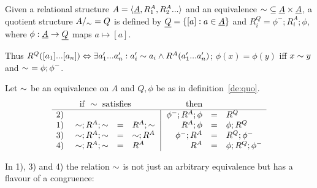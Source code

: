 \documentclass[10pt]{article}
\begin{document}
\begin{Definition}
\label{de:quo}
Given a relational structure $A=\langle\underline {A},R_1^A,R_2^A...\rangle$ and an equivalence
 $\sim\ \subseteq \underline {A}\times\underline {A}$, a
quotient structure $A/_{\sim} = Q$ is defined by
$\underline {Q} = \{[a] : a\in\underline {A}\}$ and $R_i^Q = \phi^-;R_i^A;\phi$,
where $\phi:\underline {A}\rightarrow \underline {Q}$ maps $a\mapsto [a]$.
\end{Definition}
%
Thus $R^Q([a_{1}]...[a_{n}]) \Leftrightarrow \exists a'_{1}...a'_{n}:
 a'_i\sim a_i\land R^A(a'_{1}...a'_{n})$;
$\phi(x)=\phi(y)$ iff $x\sim y$ and
 $\sim\ = \phi;\phi^-$.

\begin{Prop}
\label{pro:cong}\label{le:canonichom}
Let $\sim$ be an equivalence on $A$ and $Q,\phi$ be
as in definition~\ref{de:quo}.
\[
\begin{array}{r@{\ \ \ \ }rcl@{\ \ }|@{\ \ }rcl}
& \multicolumn{3}{l}{{\rm if\ }\congo\ {\rm satisfies}} & \multicolumn{2}{c}{{\rm then}} \\ \hline
2) &   & &                               & \phi^-;R^A;\phi &=& R^Q \\
1) & \congo;R^A;\congo & = & R^A;\congo  & R^A;\phi &=& \phi;R^Q \\
3) & \congo;R^A;\congo & = & \congo;R^A  & \phi^-;R^A &=& R^Q;\phi^- \\
4) & \congo;R^A;\congo & = & R^A         & R^A &=& \phi;R^Q;\phi^-
\end{array}
\]
\end{Prop}

\noindent
In 1), 3) and 4) the relation $\sim$ is not just an arbitrary
equivalence but has a flavour of a congruence:
\end{document}
